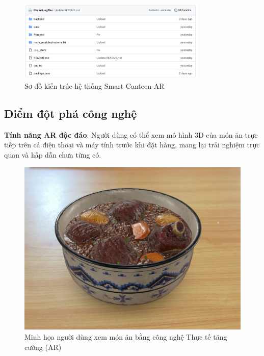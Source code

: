 \documentclass[12pt,a4paper]{article}
\begin{document}
\begin{figure}[H]
    \centering
    \includegraphics[width=0.8\textwidth]{../figures/kien_truc_he_thong.png} %
    \caption{Sơ đồ kiến trúc hệ thống Smart Canteen AR}
    \label{fig:kien_truc_he_thong}
\end{figure}

\subsection{Điểm đột phá công nghệ}
\textbf{Tính năng AR độc đáo}: Người dùng có thể xem mô hình 3D của món ăn trực tiếp trên cả điện thoại và máy tính trước khi đặt hàng, mang lại trải nghiệm trực quan và hấp dẫn chưa từng có.

\begin{figure}[H]
    \centering
    \includegraphics[width=\textwidth]{../figures/minh_hoa_ar_mon_an.png} %
    \caption{Minh họa người dùng xem món ăn bằng công nghệ Thực tế tăng cường (AR)}
    \label{fig:ar_food_view}
\end{figure}
\end{document}
